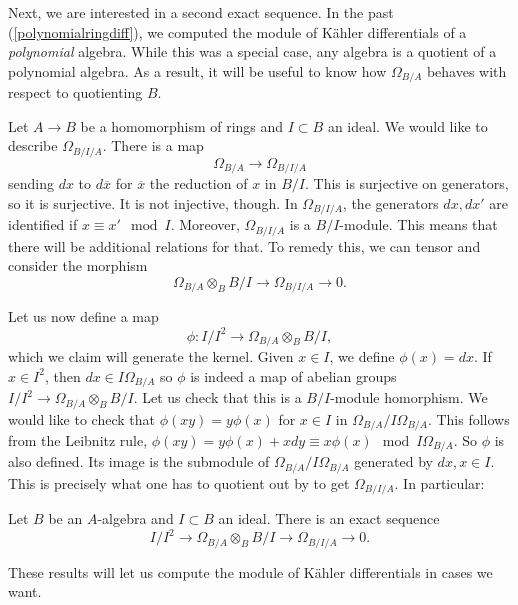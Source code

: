 Next, we are interested in a second exact sequence. In the past
(\cref{polynomialringdiff}), we computed the module of K\"ahler differentials
of a \emph{polynomial} algebra. While this was a special case, any algebra is a
quotient of a polynomial algebra. As a result, it will be useful to know how
$\Omega_{B/A}$ behaves with respect to quotienting $B$.

 Let $A
\to  B$ be a  homomorphism of rings and $I \subset B $ an ideal. We would like
to describe $\Omega_{B/I/A}$. There is a map
\[ \Omega_{B/A} \to \Omega_{B/I/A}  \]
sending $dx$ to $d \overline{x}$ for $\overline{x}$ the reduction of $x$ in
$B/I$. This is surjective on generators, so it is surjective. It is not
injective, though. In $\Omega_{B/I/A}$, the generators $dx, dx'$ are identified
if $x \equiv x' \mod I$.  Moreover, $\Omega_{B/I/A}$ is a 
$B/I$-module. 
This means that there will be additional relations for that. To remedy this, we
can tensor and consider the morphism
\[ \Omega_{B/A} \otimes_B B/I \to \Omega_{B/I/A} \to 0.  \]

Let us now define a map 
\[ \phi: I /I^2 \to \Omega_{B/A} \otimes_B B/I,  \]
which we claim will generate the kernel. Given $x \in I$, we define $\phi(x) =
dx$. If $x \in I^2$, then $dx \in I \Omega_{B/A}$ so $\phi$ is indeed a map of
abelian groups
$I/I^2 \to \Omega_{B/A} \otimes_B B/I$. Let us check that this is a
$B/I$-module homorphism. We would like to check that $\phi(xy) = y \phi(x)$
for $x \in I$ in
$\Omega_{B/A}/I \Omega_{B/A}$. This follows from the Leibnitz rule, $\phi(xy) =
y \phi(x) + xdy \equiv x \phi(x) \mod I \Omega_{B/A}$. So $\phi$ is also
defined. Its image is the submodule of $\Omega_{B/A}/I \Omega_{B/A}$ generated
by $dx, x \in I$. This is precisely what one has to quotient out by to get
$\Omega_{B/I/A}$. In particular:

\begin{proposition} Let $B$ be an $A$-algebra and $I \subset B$ an ideal.
There is an exact sequence
\[ I/I^2 \to \Omega_{B/A} \otimes_B B/I \to \Omega_{B/I/A} \to 0.  \]
\end{proposition} 

These results will let us compute the module of K\"ahler differentials in cases
we want.

